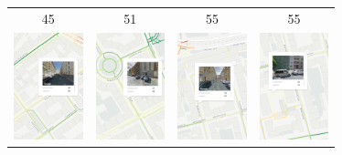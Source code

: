\documentclass[border={5pt 1pt 5pt 5pt}, varwidth=38em]{standalone}
\begin{document}

\setlength{\tabcolsep}{0.1em}
{
\renewcommand{\arraystretch}{0.5}

\begin{table}[ht]
\centering
\begin{tabular}{cccc}
{\tiny 45} & {\tiny 51} & {\tiny 55} & {\tiny 55} \\
\includegraphics[width=20mm]{neutral_cuts/osm_w64d2_neutral45.png} & \includegraphics[width=20mm]{neutral_cuts/osm_w64d2_neutral51.png} & \includegraphics[width=20mm]{neutral_cuts/osm_w64d2_neutral55.png} & \includegraphics[width=20mm]{neutral_cuts/osm_w64d2_neutral55_2.png}\\
\end{tabular}
\end{table}

}
\end{document}

